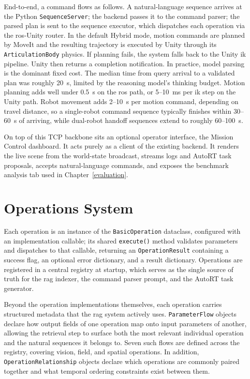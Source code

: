 End-to-end, a command flows as follows. A natural-language sequence arrives at the Python \texttt{SequenceServer}; the backend passes it to the command parser; the parsed plan is sent to the sequence executor, which dispatches each operation via the \gls{ros}-Unity router. In the default Hybrid mode, motion commands are planned by MoveIt and the resulting trajectory is executed by Unity through its \texttt{ArticulationBody} physics. If planning fails, the system falls back to the Unity \gls{ik} pipeline. Unity then returns a completion notification. In practice, model parsing is the dominant fixed cost. The median time from query arrival to a validated plan was roughly 20~s, limited by the reasoning model’s thinking budget. Motion planning adds well under 0.5~s on the \gls{ros} path, or 5–10~ms per \gls{ik} step on the Unity path. Robot movement adds 2–10~s per motion command, depending on travel distance, so a single-robot command sequence typically finishes within 30–60~s of arriving, while dual-robot handoff sequences extend to roughly 60–100~s.

On top of this TCP backbone sits an optional operator interface, the Mission Control dashboard. It acts purely as a client of the existing backend. It renders the live scene from the world-state broadcast, streams logs and AutoRT task proposals, accepts natural-language commands, and exposes the benchmark analysis tab used in Chapter~\ref{evaluation}.

\section{Operations System}\label{sec:ops-impl}
Each operation is an instance of the \texttt{BasicOperation} dataclass, configured with an implementation callable; its shared \texttt{execute()} method validates parameters and dispatches to that callable, returning an \texttt{OperationResult} containing a success flag, an optional error dictionary, and a result dictionary. Operations are registered in a central registry at startup, which serves as the single source of truth for the \gls{rag} indexer, the command parser prompt, and the AutoRT task generator.

Beyond the operation implementations themselves, each operation carries structured metadata that the \gls{rag} system actively uses. \texttt{ParameterFlow} objects declare how output fields of one operation map onto input parameters of another, allowing the retrieval step to surface both the most relevant individual operation and the natural sequences it belongs to. Seven such flows are defined across the registry, covering vision, field, and spatial operations. In addition, \texttt{OperationRelationship} objects declare which operations are commonly paired together and what temporal ordering constraints exist between them.

